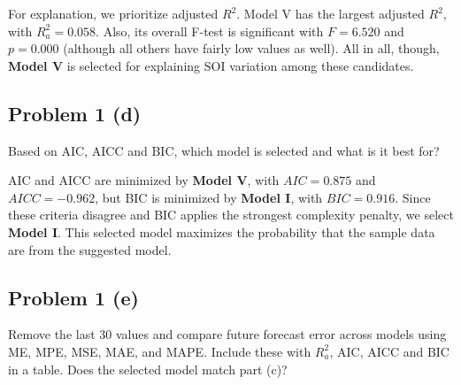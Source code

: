 \documentclass[
  10pt,
]{extarticle}
\begin{document}
For explanation, we prioritize adjusted \(R^2\). Model V has the largest adjusted \(R^2\), with \(R_a^2 = 0.058\). Also, its overall F-test is significant with \(F = 6.520\) and \(p = 0.000\) (although all others have fairly low values as well). All in all, though, \textbf{Model V} is selected for explaining SOI variation among these candidates.

\newpage

\subsection{Problem 1 (d)}\label{problem-1-d}

\begin{problem}[Problem 1 (d)]
Based on AIC, AICC and BIC, which model is selected and what is it best for?
\end{problem}

AIC and AICC are minimized by \textbf{Model V}, with \(AIC = 0.875\) and \(AICC = -0.962\), but BIC is minimized by \textbf{Model I}, with \(BIC = 0.916\). Since these criteria disagree and BIC applies the strongest complexity penalty, we select \textbf{Model I}. This selected model maximizes the probability that the sample data are from the suggested model.

\newpage

\subsection{Problem 1 (e)}\label{problem-1-e}

\begin{problem}[Problem 1 (e)]
Remove the last 30 values and compare future forecast error across models using ME, MPE, MSE, MAE, and MAPE. Include these with \(R_a^2\), AIC, AICC and BIC in a table. Does the selected model match part (c)?
\end{problem}
\end{document}
